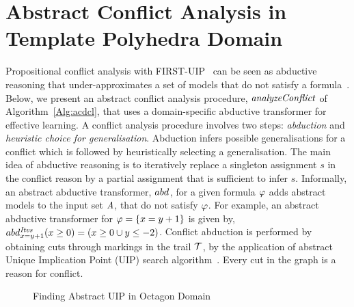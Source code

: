 \section{Abstract Conflict Analysis in Template Polyhedra Domain}\label{sec:conflict}
%
Propositional conflict analysis with FIRST-UIP~\cite{cdcl} can be seen 
as abductive reasoning that under-approximates a 
set of models that do not satisfy a formula~\cite{sas12,dhk2013-popl}.  
Below, we present an abstract conflict analysis procedure, $\mathit{analyzeConflict}$ of 
Algorithm~\ref{Alg:acdcl}, that uses a 
domain-specific abductive transformer for effective learning. 
A conflict analysis procedure involves two steps: {\em abduction} 
and {\em heuristic choice for generalisation}. Abduction infers 
possible generalisations for a conflict which is followed by 
heuristically selecting a generalisation.  The main idea of abductive reasoning is to 
iteratively replace a singleton assignment $s$ in the conflict 
reason by a partial assignment that is sufficient to infer $s$.  
Informally, an abstract abductive transformer, $abd_{}^{}$, 
for a given formula $\varphi$ adds abstract models to the input set
$\mathit{A}$, that do not satisfy $\varphi$. 
%
For example, an abstract abductive transformer for $\varphi=\{x=y+1\}$ 
is given by, $abd_{x=y+1}^{\mathit{Itvs}}(x \geq 0)=(x \geq 0 \cup y \leq -2)$.
%
Conflict abduction is performed by obtaining cuts through markings in the 
trail $\mathcal{T}$, by the application of abstract Unique Implication Point (UIP) 
search algorithm~\cite{uip,cdcl}.  Every cut in the graph is a reason for conflict. 
%
%
\begin{figure}[t]
\centering
{}
\caption{\label{conflict-oct} Finding Abstract UIP in Octagon Domain}
\end{figure}  
%
